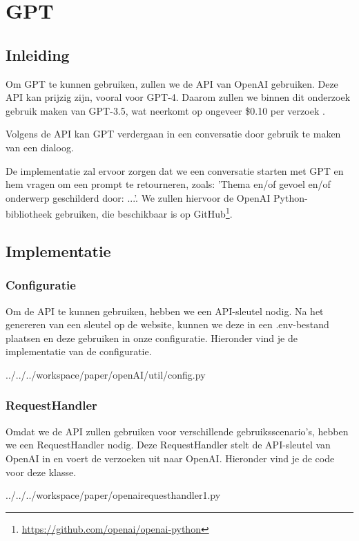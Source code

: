 \section{GPT}
\subsection{Inleiding}
Om GPT te kunnen gebruiken, zullen we de API van OpenAI gebruiken. Deze API kan prijzig zijn, vooral voor GPT-4. Daarom zullen we binnen dit onderzoek gebruik maken van GPT-3.5, wat neerkomt op ongeveer \$0.10 per verzoek \autocite{gpt_pricing}.

Volgens de API kan GPT verdergaan in een conversatie door gebruik te maken van een dialoog.

De implementatie zal ervoor zorgen dat we een conversatie starten met GPT en hem vragen om een prompt te retourneren, zoals: 'Thema en/of gevoel en/of onderwerp geschilderd door: ...'. We zullen hiervoor de OpenAI Python-bibliotheek gebruiken, die beschikbaar is op GitHub\footnote{\url{https://github.com/openai/openai-python}}.

\subsection{Implementatie}
\subsubsection{Configuratie}
Om de API te kunnen gebruiken, hebben we een API-sleutel nodig. Na het genereren van een sleutel op de website, kunnen we deze in een .env-bestand plaatsen en deze gebruiken in onze configuratie. Hieronder vind je de implementatie van de configuratie.
\begin{pythoncode}{../../../workspace/paper/openAI/util/config.py}
\end{pythoncode}

\subsubsection{RequestHandler}
Omdat we de API zullen gebruiken voor verschillende gebruiksscenario's, hebben we een RequestHandler nodig. Deze RequestHandler stelt de API-sleutel van OpenAI in en voert de verzoeken uit naar OpenAI. Hieronder vind je de code voor deze klasse.
\begin{pythoncode}{../../../workspace/paper/openairequesthandler1.py}
\end{pythoncode}

